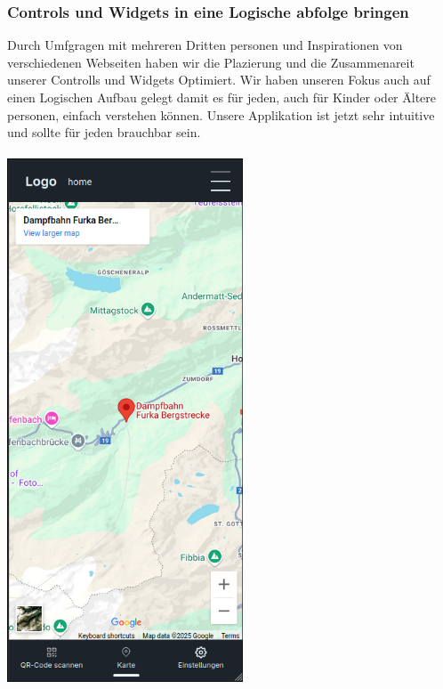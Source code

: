 \documentclass[10pt]{article}
\begin{document}
	\subsubsection{Controls und Widgets in eine Logische abfolge bringen}
	Durch Umfgragen mit mehreren Dritten personen und Inspirationen von verschiedenen Webseiten haben wir die Plazierung und die Zusammenareit unserer Controlls und Widgets Optimiert. Wir haben unseren Fokus auch auf einen Logischen Aufbau gelegt damit es für jeden, auch für Kinder oder Ältere personen, einfach verstehen können. Unsere Applikation ist jetzt sehr intuitive und sollte für jeden brauchbar sein.
	\\\\
	\includegraphics[width=7cm ]{mainpage}
\end{document}
